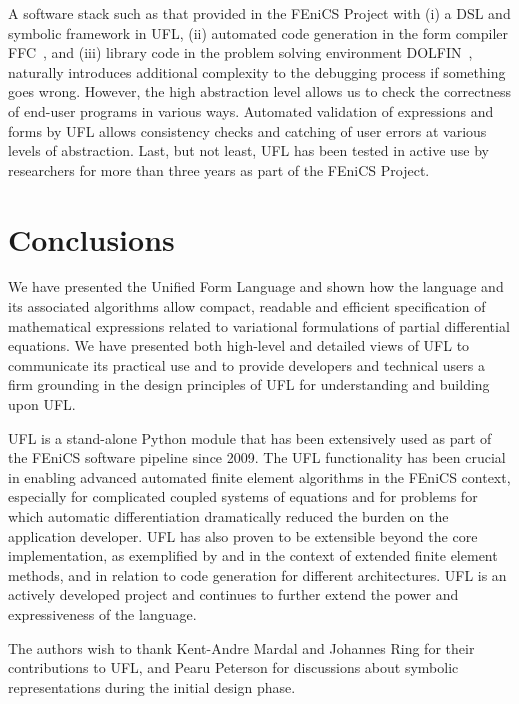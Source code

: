 \documentclass[prodmode,acmtoms]{acmsmall}
\begin{document}
A software stack such as that provided in the FEniCS Project with (i)
a DSL and symbolic framework in UFL, (ii) automated code generation in
the form compiler FFC~\citep{logg:2012}, and (iii) library code in the
problem solving environment DOLFIN~\citep{logg:2012b}, naturally
introduces additional complexity to the debugging process if something
goes wrong. However, the high abstraction level allows us to check the
correctness of end-user programs in various ways. Automated validation
of expressions and forms by UFL allows consistency checks and catching
of user errors at various levels of abstraction.  Last, but not least,
UFL has been tested in active use by researchers for more than three
years as part of the FEniCS Project.

\section{Conclusions}
\label{sec:conclusions}

We have presented the Unified Form Language and shown how the language
and its associated algorithms allow compact, readable and efficient
specification of mathematical expressions related to variational
formulations of partial differential equations. We have presented both
high-level and detailed views of UFL to communicate its practical use
and to provide developers and technical users a firm grounding in the
design principles of UFL for understanding and building upon UFL.

UFL is a stand-alone Python module that has been extensively used as part
of the FEniCS software pipeline since 2009. The UFL functionality has been
crucial in enabling advanced automated finite element algorithms in the
FEniCS context, especially for complicated coupled systems of equations
and for problems for which automatic differentiation dramatically
reduced the burden on the application developer.  UFL has also proven
to be extensible beyond the core implementation, as exemplified by
\citet{NikbakhtWells2009} and \citet{MassingEtAl2012} in the context
of extended finite element methods, and \citet{MarkallEtAl2012} in
relation to code generation for different architectures.  UFL is an
actively developed project and continues to further extend the power
and expressiveness of the language.

\begin{acks}The authors wish to thank Kent-Andre Mardal and Johannes Ring for
their contributions to UFL, and Pearu Peterson for discussions about
symbolic representations during the initial design phase.
\end{acks}


\end{document}

